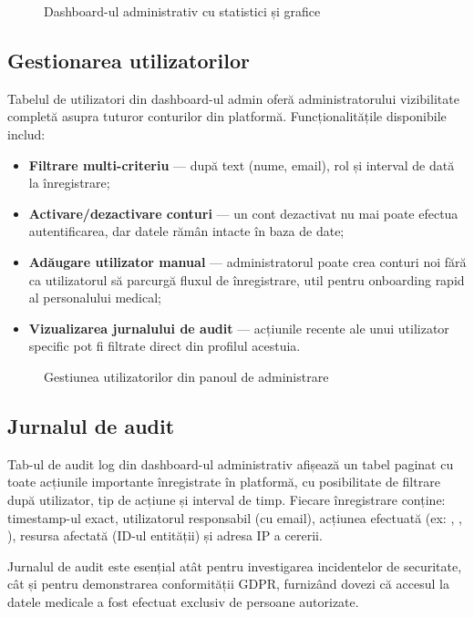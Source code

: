 \begin{figure}[H]
  \centering
  \caption{Dashboard-ul administrativ cu statistici și grafice}
  \label{fig:dashboard_admin}
\end{figure}

\subsection{Gestionarea utilizatorilor}

Tabelul de utilizatori din dashboard-ul admin oferă administratorului vizibilitate completă asupra tuturor conturilor din platformă. Funcționalitățile disponibile includ:

\begin{itemize}
  \item \textbf{Filtrare multi-criteriu} --- după text (nume, email), rol și interval de dată la înregistrare;
  \item \textbf{Activare/dezactivare conturi} --- un cont dezactivat nu mai poate efectua autentificarea, dar datele rămân intacte în baza de date;
  \item \textbf{Adăugare utilizator manual} --- administratorul poate crea conturi noi fără ca utilizatorul să parcurgă fluxul de înregistrare, util pentru onboarding rapid al personalului medical;
  \item \textbf{Vizualizarea jurnalului de audit} --- acțiunile recente ale unui utilizator specific pot fi filtrate direct din profilul acestuia.
\end{itemize}

\begin{figure}[H]
  \centering
  \caption{Gestiunea utilizatorilor din panoul de administrare}
  \label{fig:admin_utilizatori}
\end{figure}

\subsection{Jurnalul de audit}

Tab-ul de audit log din dashboard-ul administrativ afișează un tabel paginat cu toate acțiunile importante înregistrate în platformă, cu posibilitate de filtrare după utilizator, tip de acțiune și interval de timp. Fiecare înregistrare conține: timestamp-ul exact, utilizatorul responsabil (cu email), acțiunea efectuată (ex: , , ), resursa afectată (ID-ul entității) și adresa IP a cererii.

Jurnalul de audit este esențial atât pentru investigarea incidentelor de securitate, cât și pentru demonstrarea conformității GDPR, furnizând dovezi că accesul la datele medicale a fost efectuat exclusiv de persoane autorizate.
